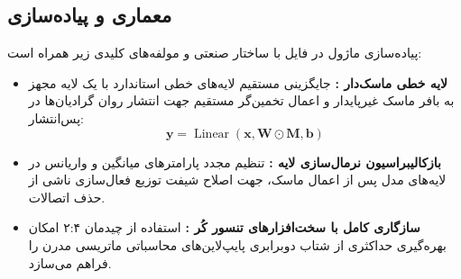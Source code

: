 \subsection{معماری و پیاده‌سازی}
پیاده‌سازی ماژول در فایل  با ساختار صنعتی و مولفه‌های کلیدی زیر همراه است:
\begin{itemize}
\item \textbf{لایه خطی ماسک‌دار :} جایگزینی مستقیم لایه‌های خطی استاندارد با یک لایه مجهز به بافر ماسک غیرپایدار و اعمال تخمین‌گر مستقیم  جهت انتشار روان گرادیان‌ها در پس‌انتشار:
\begin{equation}
\mathbf{y} = \operatorname{Linear}\left(\mathbf{x}, \mathbf{W} \odot \mathbf{M}, \mathbf{b}\right)
\end{equation}
\item \textbf{بازکالیبراسیون نرمال‌سازی لایه :} تنظیم مجدد پارامترهای میانگین و واریانس در لایه‌های  مدل پس از اعمال ماسک، جهت اصلاح شیفت توزیع فعال‌سازی ناشی از حذف اتصالات.
\item \textbf{سازگاری کامل با سخت‌افزارهای تنسور کُر :} استفاده از چیدمان ۲:۴ امکان بهره‌گیری حداکثری از شتاب دوبرابری پایپ‌لاین‌های محاسباتی ماتریسی مدرن را فراهم می‌سازد.
\end{itemize}
